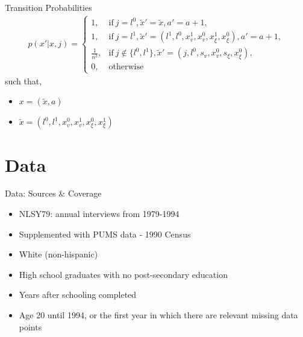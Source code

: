 \documentclass[aspectratio=169,professionalfonts]{beamer}
\begin{document}
\begin{frame}{Transition Probabilities}
  \begin{gather*}
    p(x'|x,j) = 
    \begin{cases}
      1, & \text{if} \ j = l^0, \tilde{x}' = \tilde{x}, a' = a+1, \\
      1, & \text{if} \  j = l^1, \tilde{x}' = (l^1, l^0, x_v^1, x_v^0, x_{\xi}^1, x_{\xi}^0), a' = a+1, \\
      \frac{1}{n^2}, & \text{if} \ j\notin\{l^0,l^1\}, \tilde{x}' = (j, l^0, s_v, x_v^0, s_{\xi}, x_{\xi}^0), \\
      0, & \text{otherwise}
    \end{cases}
  \end{gather*}
  such that,
  \begin{itemize}
    \item $x = (\tilde{x},a)$
    \item $\tilde{x} = (l^0, l^1, x_v^0, x_v^1, x_{\xi}^0, x_{\xi}^1)$
  \end{itemize}
\end{frame}

\section{Data}

\begin{frame}{Data: Sources \& Coverage}
  \begin{itemize}{Data Sources}
    \item NLSY79: annual interviews from 1979-1994
    \item Supplemented with PUMS data - 1990 Census
  \end{itemize}
  \begin{itemize}{Subset}
    \item White (non-hispanic)
    \item High school graduates with no post-secondary education
    \item Years after schooling completed
    \item Age 20 until 1994, or the first year in which there are relevant missing data points
  \end{itemize}
\end{frame}
\end{document}
